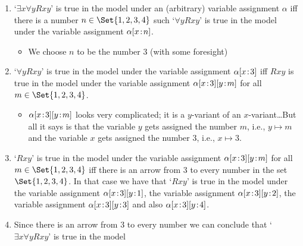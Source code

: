  \begin{enumerate}
 \item  `$\exists x\forall y Rxy$' is true in the model under an (arbitrary) variable assignment $\alpha$ iff there is a number $n\in\Set{1,2,3,4}$ such `$\forall y Rxy$' is true in the model under the variable assignment $\alpha[x \!:\! n]$. 
 \begin{itemize}
 \item We choose $n$ to be the number 3 (with some foresight)
 \end{itemize}
 \item `$\forall y Rxy$' is true in the model under the variable assignment $\alpha[x \!:\! 3]$ iff $Rxy$ is true in the model under the variable assignment $\alpha[x \!:\! 3][y \!:\! m]$ for all $m\in\Set{1,2,3,4}$.
 \begin{itemize}
 \item $\alpha[x \!:\! 3][y \!:\! m]$ looks very complicated; it is a $y$-variant of an $x$-variant\ldots But all it says is that the variable $y$ gets assigned the number $m$, i.e., $y\mapsto m$ and the variable $x$ gets assigned the number $3$, i.e., $x\mapsto 3$.
 \end{itemize}
 \item `$Rxy$' is true in the model under the variable assignment $\alpha[x \!:\! 3][y \!:\! m]$ for all $m\in\Set{1,2,3,4}$ iff there is an arrow from $3$ to every number in the set $\Set{1,2,3,4}$. In that case we have that `$Rxy$' is true in the model under the variable assignment $\alpha[x \!:\! 3][y \!:\! 1]$, the variable assignment $\alpha[x \!:\! 3][y \!:\! 2]$, the variable assignment $\alpha[x \!:\! 3][y \!:\! 3]$ and also $\alpha[x \!:\! 3][y \!:\! 4]$.
 \item Since there is an arrow from 3 to every number we can conclude that `$\exists x\forall y Rxy$' is true in the model
 \end{enumerate}
 
